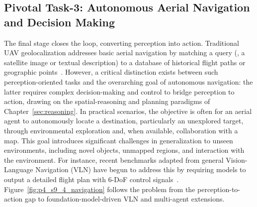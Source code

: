 \subsection{Pivotal Task-3: Autonomous Aerial Navigation and Decision Making}
\label{subsec:p4_s9_4_task3}

The final stage closes the loop, converting perception into action. Traditional UAV geolocalization addresses basic aerial navigation by matching a query (\eg, a satellite image or textual description) to a database of historical flight paths or geographic points~\cite{zheng2020university,chu2024towards}. However, a critical distinction exists between such perception-oriented tasks and the overarching goal of autonomous navigation: the latter requires complex decision-making and control to bridge perception to action, drawing on the spatial-reasoning and planning paradigms of Chapter~\ref{sec:reasoning}. In practical scenarios, the objective is often for an aerial agent to autonomously locate a destination, particularly an unexplored target, through environmental exploration and, when available, collaboration with a map. This goal introduces significant challenges in generalization to unseen environments, including novel objects, unmapped regions, and interaction with the environment. For instance, recent benchmarks adapted from general Vision-Language Navigation (VLN) have begun to address this by requiring models to output a detailed flight plan with 6-DoF control signals~\cite{wang2024towards}. Figure~\ref{fig:p4_s9_4_navigation} follows the problem from the perception-to-action gap to foundation-model-driven VLN and multi-agent extensions.



